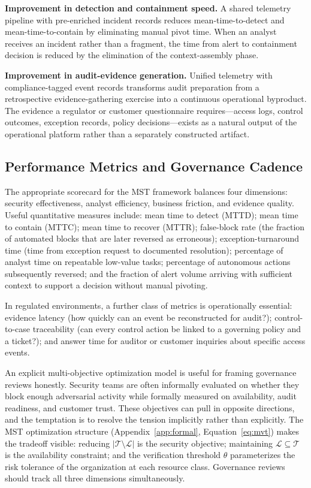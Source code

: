 \documentclass[unnumsec,webpdf,contemporary,large]{oup-authoring-template}
\theoremstyle{thmstyleone}
\theoremstyle{thmstyletwo}
\theoremstyle{thmstylethree}
\begin{document}
\textbf{Improvement in detection and containment speed.} A shared telemetry pipeline with
pre-enriched incident records reduces mean-time-to-detect and mean-time-to-contain by
eliminating manual pivot time. When an analyst receives an incident rather than a fragment,
the time from alert to containment decision is reduced by the elimination of the context-assembly
phase.

\textbf{Improvement in audit-evidence generation.} Unified telemetry with compliance-tagged
event records transforms audit preparation from a retrospective evidence-gathering exercise
into a continuous operational byproduct. The evidence a regulator or customer questionnaire
requires---access logs, control outcomes, exception records, policy decisions---exists as a
natural output of the operational platform rather than a separately constructed artifact.

\subsection{Performance Metrics and Governance Cadence}

The appropriate scorecard for the MST framework balances four dimensions: security
effectiveness, analyst efficiency, business friction, and evidence quality. Useful
quantitative measures include: mean time to detect (MTTD); mean time to contain (MTTC);
mean time to recover (MTTR); false-block rate (the fraction of automated blocks that
are later reversed as erroneous); exception-turnaround time (time from exception request
to documented resolution); percentage of analyst time on repeatable low-value tasks;
percentage of autonomous actions subsequently reversed; and the fraction of alert volume
arriving with sufficient context to support a decision without manual pivoting.

In regulated environments, a further class of metrics is operationally essential: evidence
latency (how quickly can an event be reconstructed for audit?); control-to-case
traceability (can every control action be linked to a governing policy and a ticket?);
and answer time for auditor or customer inquiries about specific access events.

An explicit multi-objective optimization model is useful for framing governance reviews
honestly. Security teams are often informally evaluated on whether they block enough
adversarial activity while formally measured on availability, audit readiness, and
customer trust. These objectives can pull in opposite directions, and the temptation is
to resolve the tension implicitly rather than explicitly. The MST optimization structure (Appendix~\ref{app:formal}, Equation~\ref{eq:mvt}) makes the tradeoff visible: reducing $|\mathcal{T} \setminus \mathcal{L}|$
is the security objective; maintaining $\mathcal{L} \subseteq \mathcal{T}$ is the
availability constraint; and the verification threshold $\theta$ parameterizes the
risk tolerance of the organization at each resource class. Governance reviews should
track all three dimensions simultaneously.
\end{document}
